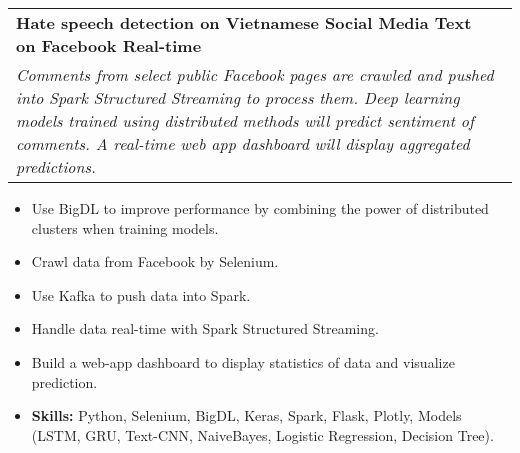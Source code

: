 \documentclass[letterpaper,11pt]{article}
\makeatletter
\newcommand{\resumeItem}[1]{
  \item\small{
    {#1 \vspace{-2pt}}
  }
}
\newcommand{\resumeProjectHeading}[3]{
  \vspace{-2pt}\item
  \begin{tabular*}{0.97\textwidth}{l@{\extracolsep{\fill}}r}
    \small #1 & #2 \\
    \multicolumn{2}{p{0.97\textwidth}}{\textit{\small #3}} %
  \end{tabular*}\vspace{-7pt}
}
\newcommand{\resumeItemListStart}{\begin{itemize}}
\newcommand{\resumeItemListEnd}{\end{itemize}\vspace{-5pt}}
\makeatother
\begin{document}
      \resumeProjectHeading
      {\textbf{Hate speech detection on Vietnamese Social Media Text on Facebook Real-time} }
      {}
      {Comments from select public Facebook pages are crawled and pushed into 
      Spark Structured Streaming to process them. Deep learning models trained using distributed methods will predict sentiment of comments. 
      A real-time web app dashboard will display aggregated predictions.}
        \resumeItemListStart
          \resumeItem{Use BigDL to improve performance by combining the power of distributed clusters when training models.}
          \resumeItem{Crawl data from Facebook by Selenium.}
          \resumeItem{Use Kafka to push data into Spark.}
          \resumeItem{Handle data real-time with Spark Structured Streaming.}
          \resumeItem{Build a web-app dashboard to display statistics of data and visualize prediction.}
          \resumeItem{\textbf{Skills:} Python, Selenium, BigDL, Keras, Spark, Flask, Plotly, 
          Models (LSTM, GRU, Text-CNN, NaiveBayes, Logistic Regression, Decision Tree).}
        \resumeItemListEnd

\end{document}
